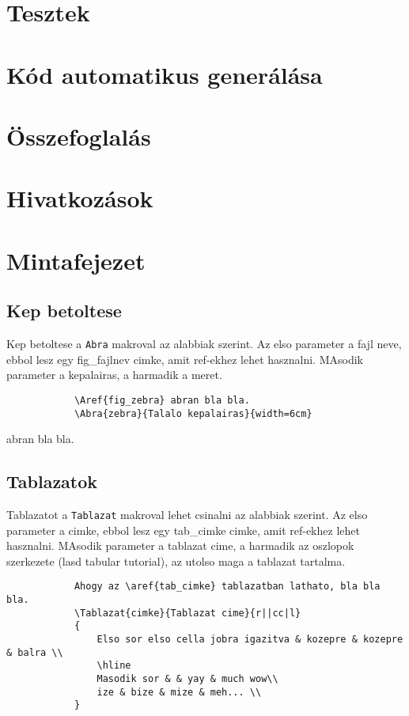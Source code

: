 \documentclass[12ppt,a4paper,oneside]{report}
\begin{document}
\chapter{Tesztek} %

\chapter{Kód automatikus generálása} %

\chapter{Összefoglalás} %

\chapter*{Hivatkozások}

\appendix

\chapter{Mintafejezet}
    \section{Kep betoltese}
        Kep betoltese a \texttt{Abra} makroval az alabbiak szerint. Az elso parameter a fajl neve, ebbol lesz egy fig\_fajlnev cimke, amit ref-ekhez lehet hasznalni. MAsodik parameter a kepalairas, a harmadik a meret.
        \begin{verbatim}
            \Aref{fig_zebra} abran bla bla.
            \Abra{zebra}{Talalo kepalairas}{width=6cm}
        \end{verbatim}

         abran bla bla.


    \section{Tablazatok}
        Tablazatot a \texttt{Tablazat} makroval lehet csinalni az alabbiak szerint. Az elso parameter a cimke, ebbol lesz egy tab\_cimke cimke, amit ref-ekhez lehet hasznalni. MAsodik parameter a tablazat cime, a harmadik az oszlopok szerkezete (lasd tabular tutorial), az utolso maga a tablazat tartalma.
        \begin{verbatim}
            Ahogy az \aref{tab_cimke} tablazatban lathato, bla bla bla.
            \Tablazat{cimke}{Tablazat cime}{r||cc|l}
            {
                Elso sor elso cella jobra igazitva & kozepre & kozepre & balra \\
                \hline
                Masodik sor & & yay & much wow\\
                ize & bize & mize & meh... \\
            }
        \end{verbatim}
\end{document}
